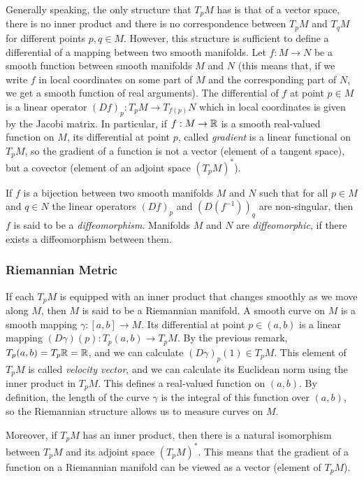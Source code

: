 Generally speaking, the only structure that $T_pM$ has is that of a vector space, there is no
inner product and there is no correspondence between $T_pM$ and $T_qM$ for different
points $p, q \in M$. However, this structure is sufficient to define a differential
of a mapping between two smooth manifolds. Let $f : M \to N$ be a smooth
function between smooth manifolds $M$ and $N$ (this means that, if we write
$f$ in local coordinates on some part of $M$ and the corresponding part of $N$,
we get a smooth function of real arguments). The differential of $f$
at point $p \in M$ is a linear operator $(Df)_p : T_pM \to T_{f(p)}N$ which in
local coordinates is given by the Jacobi matrix. In particular,
if $f : M \to \mathbb{R}$ is a smooth real-valued function on $M$, its differential at point $p$,
called \textit{gradient} is a linear functional on $T_pM$,
so the gradient of a function is not a vector (element of a tangent space),
but a covector (element of an adjoint space $(T_pM)^*$).


If $f$ is a bijection between two smooth manifolds $M$ and $N$ such that
for all $p \in M$ and $q \in N$ the linear operators
$(Df)_p$ and $(D(f^{-1}))_q$ are non-singular, then $f$ is said to be a \textit{diffeomorphism}.
Manifolds $M$ and $N$ are \textit{diffeomorphic}, if there exists a diffeomorphism between them.

\subsubsection{Riemannian Metric}

If each $T_pM$ is equipped with an inner product
that changes smoothly as we move along $M$, then $M$ is said to be a Riemannian manifold.
A smooth curve on $M$ is a smooth mapping $\gamma : [a, b] \rightarrow M$.
Its differential at point $p \in (a, b)$ is a linear mapping $(D\gamma)(p) : T_p(a,b) \to T_pM$.
By the previous remark, $T_p(a, b) = T_p \mathbb{R} = \mathbb{R}$, and we can calculate $(D\gamma)_p(1) \in T_pM$.
This element of $T_pM$ is called \textit{velocity vector}, and we can calculate
its Euclidean norm using the inner product in $T_pM$. This defines a real-valued function
on $(a, b)$. By definition, the length of the curve $\gamma$ is the integral
of this function over $(a,b)$, so the Riemannian structure allows us to measure curves on $M$.


Moreover, if $T_pM$ has an inner product, then there is a natural isomorphism
between $T_pM$ and its adjoint space $(T_pM)^*$. This means that the 
gradient of a function on a Riemannian manifold can be viewed as a vector (element
of $T_pM$).


